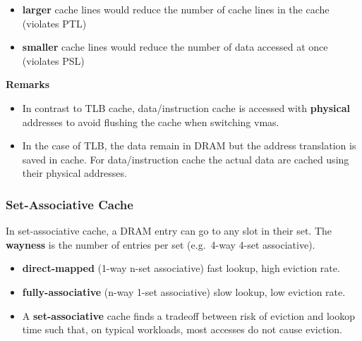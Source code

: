 \begin{itemize}
    \item \textbf{larger} cache lines would reduce the number of cache lines in the cache (violates PTL)
    \item \textbf{smaller} cache lines would reduce the number of data accessed at once (violates PSL)
\end{itemize}

\newpar{}
\textbf{Remarks}
\begin{itemize}
    \item In contrast to TLB cache, data/instruction cache is accessed with \textbf{physical} addresses to avoid flushing the cache when switching vmas.
    \item In the case of TLB, the data remain in DRAM but the address translation is saved in cache. For data/instruction cache the actual data are cached using their physical addresses.
\end{itemize}

\subsubsection{Set-Associative Cache}
In set-associative cache, a DRAM entry can go to any slot in their set. The \textbf{wayness} is the number of entries per set (e.g.\ 4-way 4-set associative).

\begin{itemize}
    \item \textbf{direct-mapped} (1-way n-set associative) fast lookup, high eviction rate. %
    \item \textbf{fully-associative} (n-way 1-set associative) slow lookup, low eviction rate. %
    \item A \textbf{set-associative} cache finds a tradeoff between risk of eviction and lookop time such that, on typical workloads, most accesses do not cause eviction.
\end{itemize}

